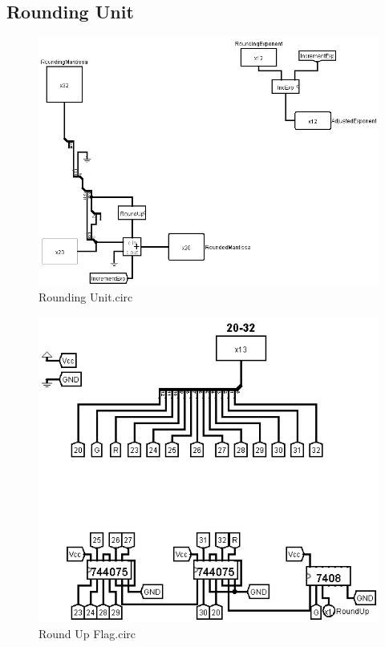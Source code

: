 \documentclass[18pt]{article}
\begin{document}
\subsection{Rounding Unit}
\begin{figure}[!h]
    \centering
    \captionsetup{font=Large}
    \includegraphics[scale=0.2]{Util/RoundingUnit.png}
    \caption{Rounding Unit.circ}
\end{figure}
\begin{figure}[!h]
    \centering
    \captionsetup{font=Large}
    \includegraphics[scale=0.5]{Util/RoundUpFlag.png}
    \caption{Round Up Flag.circ}
\end{figure}
\end{document}
